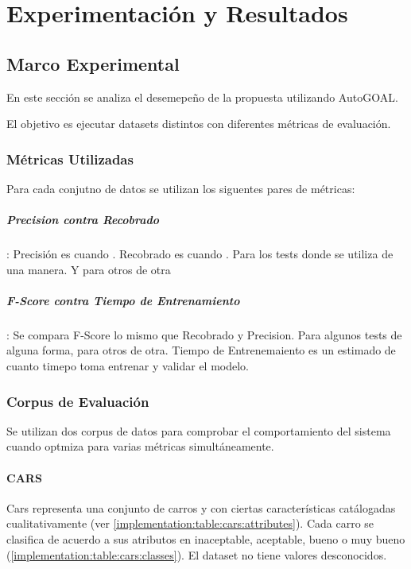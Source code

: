 \chapter{Experimentaci\'on y Resultados}\label{chapter:experiments}
\section{Marco Experimental}

En este secci\'on se analiza el desemepe\~no de la propuesta utilizando AutoGOAL.

El objetivo es ejecutar datasets distintos con diferentes m\'etricas de evaluaci\'on.

\subsection{M\'etricas Utilizadas}

Para cada conjutno de datos se utilizan los siguentes pares de m\'etricas:

\paragraph{Precision contra Recobrado}: Precisi\'on es cuando . Recobrado es cuando . Para los tests donde se utiliza de una manera. Y para otros de otra

\paragraph{F-Score contra Tiempo de Entrenamiento}: Se compara F-Score lo mismo que Recobrado y Precision. Para algunos tests de alguna forma, para otros de otra. Tiempo de Entrenemaiento es un estimado de cuanto timepo toma entrenar y validar el modelo.

\subsection{Corpus de Evaluaci\'on}

Se utilizan dos corpus de datos para comprobar el comportamiento del sistema cuando optmiza para varias m\'etricas simult\'aneamente.

\subsubsection{CARS}
Cars representa una conjunto de carros y con ciertas caracter\'isticas cat\'alogadas cualitativamente (ver \ref{implementation:table:cars:attributes}). Cada carro se clasifica de acuerdo a sus atributos  en inaceptable, aceptable, bueno o muy bueno (\ref{implementation:table:cars:classes}). El dataset no tiene valores desconocidos.

